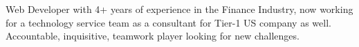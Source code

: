 

\begin{cvparagraph}

Web Developer with 4+ years of experience in the Finance Industry, now working for a technology service team as a consultant for Tier-1 US company as well. Accountable, inquisitive, teamwork player looking for new challenges.
\end{cvparagraph}

